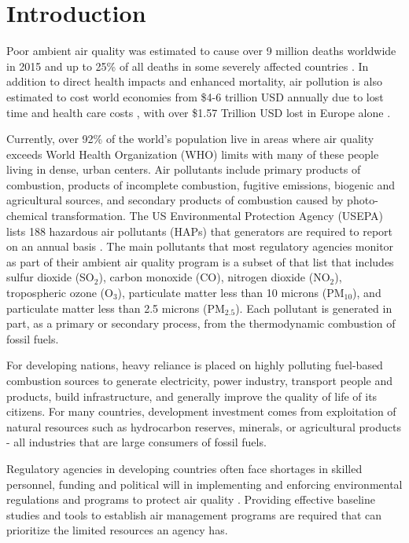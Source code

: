 \chapter{Introduction}

Poor ambient air quality was estimated to cause over 9 million deaths worldwide in 2015 and up to 25\% of all deaths in some severely affected countries \citep{Landrigan2017}. In addition to direct health impacts and enhanced mortality, air pollution is also estimated to cost world economies from \$4-6 trillion USD annually due to lost time and health care costs \citep{Landrigan2017, Narain2016}, with over \$1.57 Trillion USD lost in Europe alone \citep{Roy2015}.

Currently, over 92\% of the world's population live in areas where air quality exceeds World Health Organization (WHO) limits \citep{WHO2016} with many of these people living in dense, urban centers. Air pollutants include primary products of combustion, products of incomplete combustion, fugitive emissions, biogenic and agricultural sources, and secondary products of combustion caused by photo-chemical transformation. The US Environmental Protection Agency (USEPA) lists 188 hazardous air pollutants (HAPs) that generators are required to report on an annual basis \citep{USEPA1996}. The main pollutants that most regulatory agencies monitor as part of their ambient air quality program is a subset of that list that includes sulfur dioxide (SO$_{2}$), carbon monoxide (CO), nitrogen dioxide (NO$_{2}$), tropospheric ozone (O$_{3}$),  particulate matter less than 10 microns (PM$_{10}$), and particulate matter less than 2.5 microns (PM$_{2.5}$). Each pollutant is generated in part, as a primary or secondary process, from the thermodynamic combustion of fossil fuels.

For developing nations, heavy reliance is placed on highly polluting fuel-based combustion sources to generate electricity, power industry, transport people and products, build infrastructure, and generally improve the quality of life of its citizens. For many countries, development investment comes from exploitation of natural resources such as hydrocarbon reserves, minerals, or agricultural products - all industries that are large consumers of fossil fuels.

Regulatory agencies in developing countries often face shortages in skilled personnel, funding and political will in implementing and enforcing environmental regulations and programs to protect air quality \citep{Freeman2015a}. Providing effective baseline studies and tools to establish air management programs are required that can prioritize the limited resources an agency has. 

